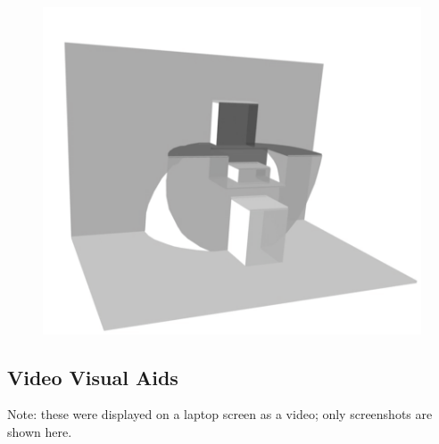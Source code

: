 \begin{figure}[htbp]
\centering
\includegraphics{figures/92_Appendix_Visual_Aids_Materials/still_card5.png}
\caption{}
\end{figure}

\clearpage

\subsection{Video Visual Aids}\label{video-visual-aids}

Note: these were displayed on a laptop screen as a video; only
screenshots are shown here.

